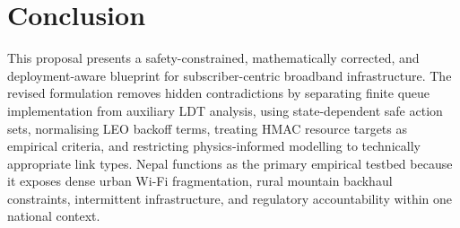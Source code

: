 \section{Conclusion}
\label{sec:conclusion}

This proposal presents a safety-constrained, mathematically corrected, and deployment-aware blueprint for subscriber-centric broadband infrastructure. The revised formulation removes hidden contradictions by separating finite queue implementation from auxiliary LDT analysis, using state-dependent safe action sets, normalising LEO backoff terms, treating HMAC resource targets as empirical criteria, and restricting physics-informed modelling to technically appropriate link types. Nepal functions as the primary empirical testbed because it exposes dense urban Wi-Fi fragmentation, rural mountain backhaul constraints, intermittent infrastructure, and regulatory accountability within one national context.
